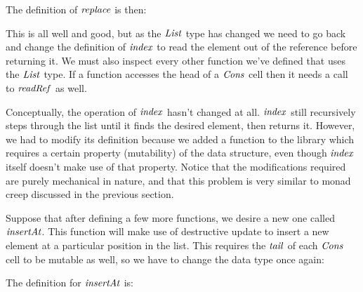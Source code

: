 
The definition of $\operatorname{\mathit{replace}}$ is then:


This is all well and good, but as the $\operatorname{\mathit{List}}$ type has changed we need to go back and change the definition of $\operatorname{\mathit{index}}$ to read the element out of the reference before returning it. We must also inspect every other function we've defined that uses the $\operatorname{\mathit{List}}$ type. If a function accesses the head of a $\operatorname{\mathit{Cons}}$ cell then it needs a call to $\operatorname{\mathit{readRef}}$ as well.



Conceptually, the operation of $\operatorname{\mathit{index}}$ hasn't changed at all. $\operatorname{\mathit{index}}$ still recursively steps through the list until it finds the desired element, then returns it. However, we had to modify its definition because we added a function to the library which requires a certain property (mutability) of the data structure, even though $\operatorname{\mathit{index}}$ itself doesn't make use of that property. Notice that the modifications required are purely mechanical in nature, and that this problem is very similar to monad creep discussed in the previous section.

Suppose that after defining a few more functions, we desire a new one called $\operatorname{\mathit{insertAt}}$. This function will make use of destructive update to insert a new element at a particular position in the list. This requires the $\operatorname{\mathit{tail}}$ of each $\operatorname{\mathit{Cons}}$ cell to be mutable as well, so we have to change the data type once again:


The definition for $\operatorname{\mathit{insertAt}}$ is:

